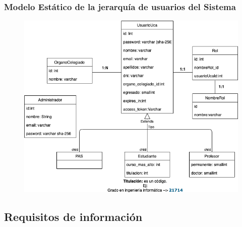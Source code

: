 \documentclass[12pt,letterpaper]{report}
\begin{document}
		\subsubsection{Modelo Estático de la jerarquía de usuarios del Sistema}
			\begin{figure}[htp]
				\centering
				\includegraphics[width=0.9\linewidth]{img/MEJerarquiaUsuarios}
				\caption{}
				\label{fig:meprocesoselectorales}
			\end{figure}
		\newpage	
	\subsection{Requisitos de información}
		
	\newpage
\end{document}
